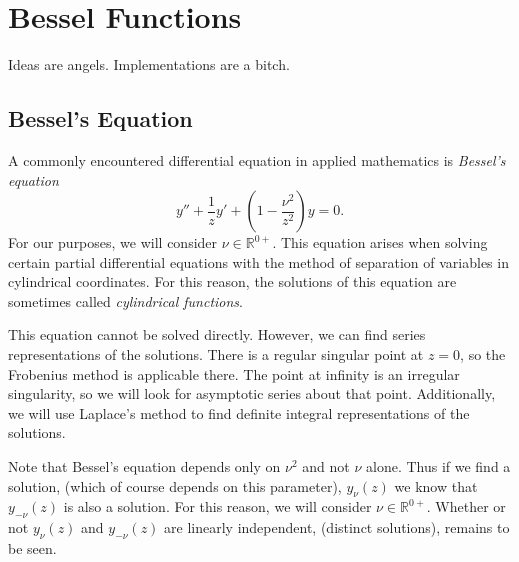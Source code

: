 \flushbottom











\chapter{Bessel Functions}



Ideas are angels.  Implementations are a bitch.








\section{Bessel's Equation}



A commonly encountered differential equation in applied mathematics is 
\textit{Bessel's equation}
\[ 
y'' + \frac{1}{z} y' + \left( 1 - \frac{\nu^2}{z^2} \right)y = 0.
\]
For our purposes, we will consider $\nu \in \mathbb{R}^{0+}$.
This equation arises when solving certain partial differential equations
with the method of separation of variables
in cylindrical coordinates.  For this reason, the solutions of this
equation are sometimes called \textit{cylindrical functions}.

This equation cannot be solved directly.  However, we can
find series representations of the solutions.  There is a regular singular
point at $z = 0$, so the Frobenius method is applicable there.
The point at infinity is an irregular singularity, so we will look
for asymptotic series about that point.  
Additionally, we will use Laplace's method to find definite integral
representations of the solutions.

Note that Bessel's equation depends only on $\nu^2$ and not $\nu$ alone.
Thus if we find a solution, (which of course depends on this parameter),
$y_\nu(z)$ we know that $y_{-\nu}(z)$ is also a solution.  For this 
reason, we will consider $\nu \in \mathbb{R}^{0+}$.
Whether or not $y_\nu(z)$ and $y_{-\nu}(z)$ are linearly independent,
(distinct solutions), remains to be seen.



